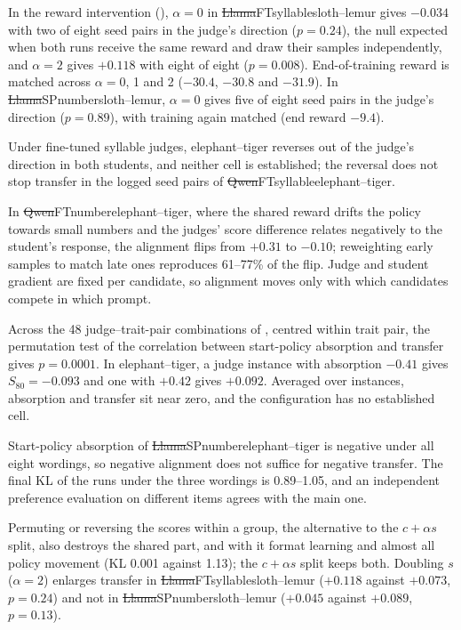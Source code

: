 In the reward intervention (\edtab{\ref{tab:ed-alpha}}), $\alpha=0$ in \st{Llama}{FT}{syllable}{sloth--lemur} gives $-0.034$ with two of eight seed pairs in the judge's direction ($p = 0.24$), the null expected when both runs receive the same reward and draw their samples independently, and $\alpha=2$ gives $+0.118$ with eight of eight ($p = 0.008$). End-of-training reward is matched across $\alpha=0$, 1 and 2 ($-30.4$, $-30.8$ and $-31.9$). In \st{Llama}{SP}{number}{sloth--lemur}, $\alpha=0$ gives five of eight seed pairs in the judge's direction ($p = 0.89$), with training again matched (end reward $-9.4$).

Under fine-tuned syllable judges, elephant--tiger reverses out of the judge's direction in both students, and neither cell is established; the reversal does not stop transfer in the logged seed pairs of \st{Qwen}{FT}{syllable}{elephant--tiger}.

In \st{Qwen}{FT}{number}{elephant--tiger}, where the shared reward drifts the policy towards small numbers and the judges' score difference relates negatively to the student's response, the alignment flips from $+0.31$ to $-0.10$; reweighting early samples to match late ones reproduces 61--77\% of the flip. Judge and student gradient are fixed per candidate, so alignment moves only with which candidates compete in which prompt.

Across the 48 judge--trait-pair combinations of , centred within trait pair, the permutation test of the correlation between start-policy absorption and transfer gives $p = 0.0001$. In elephant--tiger, a judge instance with absorption $-0.41$ gives $S_{80} = -0.093$ and one with $+0.42$ gives $+0.092$. Averaged over instances, absorption and transfer sit near zero, and the configuration has no established cell.

Start-policy absorption of \st{Llama}{SP}{number}{elephant--tiger} is negative under all eight wordings, so negative alignment does not suffice for negative transfer. The final KL of the runs under the three wordings is 0.89--1.05, and an independent preference evaluation on different items agrees with the main one.

Permuting or reversing the scores within a group, the alternative to the $c + \alpha s$ split, also destroys the shared part, and with it format learning and almost all policy movement (KL 0.001 against 1.13); the $c + \alpha s$ split keeps both. Doubling $s$ ($\alpha = 2$) enlarges transfer in \st{Llama}{FT}{syllable}{sloth--lemur} ($+0.118$ against $+0.073$, $p = 0.24$) and not in \st{Llama}{SP}{number}{sloth--lemur} ($+0.045$ against $+0.089$, $p = 0.13$).

